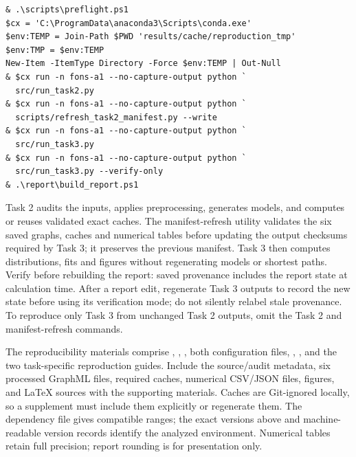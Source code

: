 \begingroup\footnotesize
\begin{verbatim}
& .\scripts\preflight.ps1
$cx = 'C:\ProgramData\anaconda3\Scripts\conda.exe'
$env:TEMP = Join-Path $PWD 'results/cache/reproduction_tmp'
$env:TMP = $env:TEMP
New-Item -ItemType Directory -Force $env:TEMP | Out-Null
& $cx run -n fons-a1 --no-capture-output python `
  src/run_task2.py
& $cx run -n fons-a1 --no-capture-output python `
  scripts/refresh_task2_manifest.py --write
& $cx run -n fons-a1 --no-capture-output python `
  src/run_task3.py
& $cx run -n fons-a1 --no-capture-output python `
  src/run_task3.py --verify-only
& .\report\build_report.ps1
\end{verbatim}
\endgroup

Task 2 audits the inputs, applies preprocessing, generates models, and computes or reuses validated exact caches. The manifest-refresh utility validates the six saved graphs, caches and numerical tables before updating the output checksums required by Task 3; it preserves the previous manifest. Task 3 then computes distributions, fits and figures without regenerating models or shortest paths. Verify before rebuilding the report: saved provenance includes the report state at calculation time. After a report edit, regenerate Task 3 outputs to record the new state before using its verification mode; do not silently relabel stale provenance. To reproduce only Task 3 from unchanged Task 2 outputs, omit the Task 2 and manifest-refresh commands.

The reproducibility materials comprise , , , both configuration files, , , and the two task-specific reproduction guides. Include the source/audit metadata, six processed GraphML files, required caches, numerical CSV/JSON files, figures, and LaTeX sources with the supporting materials. Caches are Git-ignored locally, so a supplement must include them explicitly or regenerate them. The dependency file gives compatible ranges; the exact versions above and machine-readable version records identify the analyzed environment. Numerical tables retain full precision; report rounding is for presentation only.
